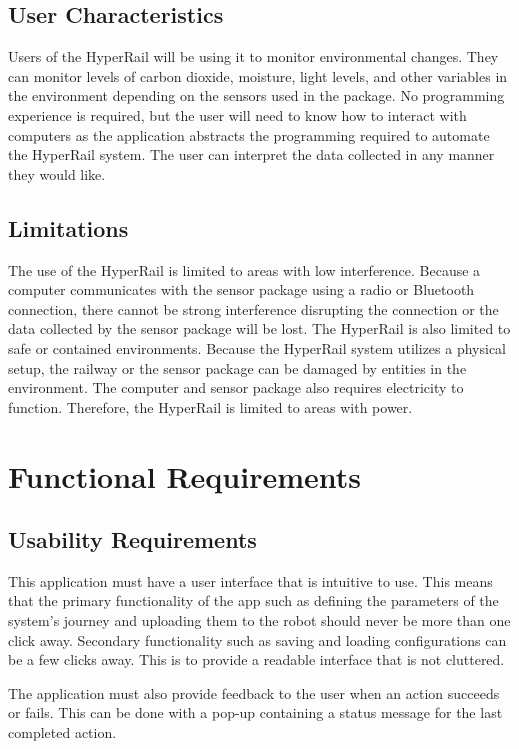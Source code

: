 \documentclass[onecolumn, draftclsnofoot,10pt, compsoc]{IEEEtran}
\begin{document}
\subsection{User Characteristics}
Users of the HyperRail will be using it to monitor environmental changes. They can monitor levels of carbon dioxide, moisture, light levels, and other variables in the environment depending on the sensors used in the package. No programming experience is required, but the user will need to know how to interact with computers as the application abstracts the programming required to automate the HyperRail system. The user can interpret the data collected in any manner they would like.


\subsection{Limitations}
The use of the HyperRail is limited to areas with low interference. Because a computer communicates with the sensor package using a radio or Bluetooth connection, there cannot be strong interference disrupting the connection or the data collected by the sensor package will be lost. The HyperRail is also limited to safe or contained environments. Because the HyperRail system utilizes a physical setup, the railway or the sensor package can be damaged by entities in the environment. The computer and sensor package also requires electricity to function. Therefore, the HyperRail is limited to areas with power.



\section{Functional Requirements}

\subsection{Usability Requirements}
This application must have a user interface that is intuitive to use. This means that the primary functionality of the app such as defining the parameters of the system's journey and uploading them to the robot should never be more than one click away. Secondary functionality such as saving and loading configurations can be a few clicks away. This is to provide a readable interface that is not cluttered. 

The application must also provide feedback to the user when an action succeeds or fails. This can be done with a pop-up containing a status message for the last completed action.
\end{document}
